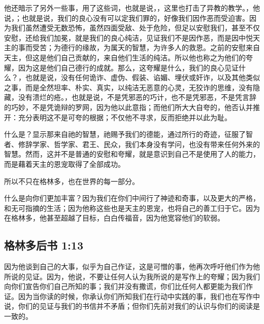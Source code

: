 他还暗示了另外一些事，用了这些词，也就是说，，这里也打击了异教的教学。，他说，；也就是说，我们的良心没有可以定我们罪的，好像我们因作恶而受迫害。因为我们虽然遭受无数恐怖，虽然四面受敌、处于危险，但足以安慰我们，甚至不仅安慰，还给我们加冕，就是我们的良心纯洁，见证我们不是因作恶，而是因中悦天主的事而受苦；为德行的缘故，为属天的智慧，为许多人的救恩。之前的安慰来自天主，但这是他们自己贡献的，来自他们生活的纯洁。所以他也称之为他们的夸耀，因为这是他们自己德行的成就。那么，这夸耀是什么，我们的良心见证什么？，也就是说，没有任何诡诈、虚伪、假装、谄媚、埋伏或奸诈，以及其他类似之事，而是全然坦率、朴实、真实，以纯洁无恶意的心灵，无狡诈的思维，没有隐藏，没有溃烂的疮。，也就是说，不是凭邪恶的巧计，也不是凭邪恶，不是凭言辞的巧妙，不是凭诡辩的罗网，因为他以此意指；而他们所大大自夸的，他否认并推开：充分表明这不是可夸的根据；不仅他不寻求，反而拒绝并以此为耻。\par

\par

什么是？显示那来自祂的智慧，祂赐予我们的德能，通过所行的奇迹，征服了智者、修辞学家、哲学家、君王、民众，我们本身没有学问，也没有带来任何外来的智慧。然而，这并不是普通的安慰和夸耀，就是意识到自己不是使用了人的能力，而是藉着天主的恩宠取得了全部成功。\par

所以不只在格林多，也在世界的每一部分。\par

什么是向你们更加丰富？因为我们在你们中间行了神迹和奇事，以及更大的严格，和无可指摘的生活；因为他称这些也是天主的恩宠，也将自己的善工归于它。因为在格林多，他甚至超越了目标，白白传福音，因为他宽容他们的软弱。\par


\subsection{格林多后书 1:13}

\par

因为他谈到自己的大事，似乎为自己作证，这是可憎的事，他再次呼吁他们作为他所说的见证。因为，他说，不要让任何人认为我所说的是写作上的夸耀；因为我们向你们宣告你们自己所知的事；我们并没有撒谎，你们比任何人都更能为我们作证。因为当你读的时候，你承认你们所知我们在行动中实践的事，我们也在写作中说，你们的见证与我们的书信并不矛盾；但你们先前对我们的认识与你们的阅读是一致的。\par

